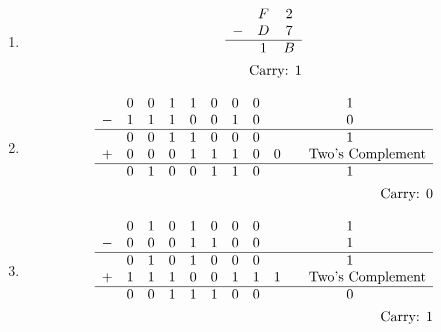 \documentclass[12pt letter]{report}
\begin{document}
{\begin{enumerate}
    \item
          \begin{align*}
            \begin{array}{c c c c c c c c c}
                & F & 2 \\
              - & D & 7 \\
              \hline
                & 1 & B \\
            \end{array} \\
            \text{Carry: 1}
          \end{align*}
    \item
          \begin{align*}
            \begin{array}{c c c c c c c c c}
                & 0 & 0 & 1 & 1 & 0 & 0 & 0 & 1                         \\
              - & 1 & 1 & 1 & 0 & 0 & 1 & 0 & 0                         \\
              \hline
                & 0 & 0 & 1 & 1 & 0 & 0 & 0 & 1                         \\
              + & 0 & 0 & 0 & 1 & 1 & 1 & 0 & 0 \tag*{Two's Complement} \\
              \hline
                & 0 & 1 & 0 & 0 & 1 & 1 & 0 & 1
            \end{array} \\
            \text{Carry: 0}
          \end{align*}
    \item
          \begin{align*}
            \begin{array}{c c c c c c c c c}
                & 0 & 1 & 0 & 1 & 0 & 0 & 0 & 1                         \\
              - & 0 & 0 & 0 & 1 & 1 & 0 & 0 & 1                         \\
              \hline
                & 0 & 1 & 0 & 1 & 0 & 0 & 0 & 1                         \\
              + & 1 & 1 & 1 & 0 & 0 & 1 & 1 & 1 \tag*{Two's Complement} \\
              \hline
                & 0 & 0 & 1 & 1 & 1 & 0 & 0 & 0
            \end{array} \\
            \text{Carry: 1}
          \end{align*}
  \end{enumerate}
}
\end{document}
